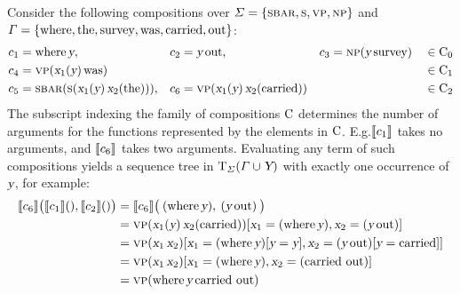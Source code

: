 \documentclass[../document.tex]{subfiles}
\begin{document}

    \begin{example}\label{ex:dcp:comp}
        Consider the following compositions over  \(\varSigma = \{ \textsc{sbar}, \textsc{s}, \textsc{vp}, \textsc{np} \}\) and \(\varGamma = \{\text{where}, \text{the}, \text{survey}, \text{was}, \text{carried}, \text{out}\}\):
        \begin{align*}
             c_1 &= \text{where} \, \textsl{y},
            &c_2 &= \textsl{y} \, \text{out},
            &c_3 &= \textsc{np} (\textsl{y} \, \text{survey}) && \in \mathrm{C}_0\\
             c_4 &= \textsc{vp}(\textsl{x}_1(\textsl{y}) \, \text{was}) && && && \in \mathrm{C}_1 \\
             c_5 &= \textsc{sbar} (\textsc{s} (\textsl{x}_1(\textsl{y}) \, \textsl{x}_2(\text{the}))),
            &c_6 &= \textsc{vp}(\textsl{x}_1(\textsl{y}) \, \textsl{x}_2(\text{carried})) && && \in \mathrm{C}_2
        \end{align*}
        The subscript indexing the family of compositions \(\mathrm{C}\) determines the number of arguments for the functions represented by the elements in \(\mathrm{C}\).
        E.g.\@ \(\llbracket c_1\rrbracket\) takes no arguments, and \(\llbracket c_6\rrbracket\) takes two arguments.
        Evaluating any term of such compositions yields a sequence tree in \(\operatorname{T}_\varSigma(\varGamma \cup \textsl{Y})\) with exactly one occurrence of \(\textsl{y}\), for example:
        \begin{align*}
            \llbracket c_6\rrbracket \big( \llbracket c_1\rrbracket(), \llbracket c_2\rrbracket() \big)
                &= \llbracket c_6\rrbracket \big( \: (\text{where} \, \textsl{y}), \: (\textsl{y} \, \text{out}) \: \big) \\
                &= \textsc{vp}(\textsl{x}_1(\textsl{y}) \, \textsl{x}_2(\text{carried}))[\textsl{x}_1=(\text{where} \, \textsl{y}), \textsl{x}_2=(\textsl{y} \, \text{out})] \\
                &= \textsc{vp}(\textsl{x}_1 \, \textsl{x}_2)[\textsl{x}_1=(\text{where} \, \textsl{y})[\textsl{y}=\textsl{y}], \textsl{x}_2=(\textsl{y} \, \text{out})[\textsl{y}=\text{carried}]] \\
                &= \textsc{vp}(\textsl{x}_1 \, \textsl{x}_2)[\textsl{x}_1=(\text{where} \, \textsl{y}), \textsl{x}_2=(\text{carried out})] \\
                &= \textsc{vp}(\text{where} \, \textsl{y} \, \text{carried out})
        \end{align*}
    \end{example}
\end{document}
